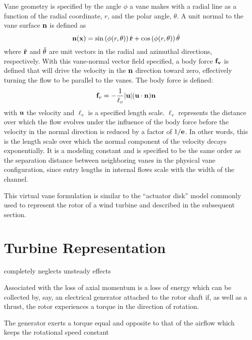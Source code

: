 Vane geometry is specified by the angle $\phi$ a vane makes with a
radial line as a function of the radial coordinate, $r$, and the polar
angle, $\theta$. A unit normal to the vane surface ${\bf n}$ is defined
as 
%
\begin{equation}
 {\bf n}({\bf x}) = \sin \left(\phi(r,\theta) \right) \hat{{\bf r}}+ \cos
  \left(\phi(r,\theta) \right) \hat{{\bf \theta}} 
\end{equation}
%
where $\hat{{\bf r}}$ and $\hat{{\bf \theta}}$ are unit
vectors in the radial and azimuthal directions, respectively.
With this vane-normal vector field specified, a body force ${\bf f_v}$
is defined
that will drive the velocity in the ${\bf n}$ direction toward zero,
effectively turning the flow to be parallel to the vanes. The body
force is defined:
\begin{equation}
 {\bf f}_v= -\frac{1}{\ell_v}|{\bf u}|({\bf u}\cdot{\bf n}){\bf n}
 \label{eqn:body_force}
\end{equation}
with ${\bf u}$ the velocity and $\ell_v$ is a specified length
scale. $\ell_v$ represents the distance over which the
flow evolves under the influence of the body force before the
velocity in the normal direction is reduced by a factor of $1/{\bf
e}$.
In other words, this is the length scale over which the
normal component of the velocity decays exponentially.
It is a modeling constant and is specified to be
the same order as the separation distance between neighboring vanes in
the physical vane configuration, since entry lengths in internal flows
scale with the width of the channel.

This virtual vane formulation is similar to the ``actuator disk'' model
commonly used to represent the rotor of a wind turbine and
described in the subsequent section. 

\section{Turbine Representation}
\label{sec:actuator_disk}
%
%


completely neglects unsteady effects

Associated with the loss of axial momentum is a loss of energy which can
be collected by, say, an electrical generator attached to the rotor
shaft if, as well as a thrust, the rotor experiences a torque in the
direction of rotation. 

The generator exerts a torque equal and opposite to that of the airflow
which keeps the rotational speed constant

